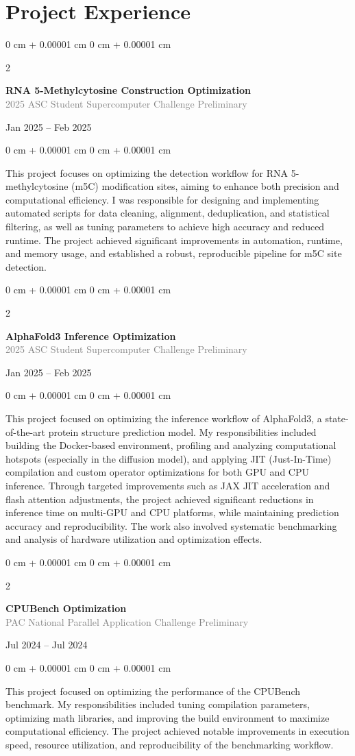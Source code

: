 \documentclass[10pt, letterpaper]{article}
\newcommand{\entryvspace}{\vspace{0.22cm}}
\newenvironment{onecolentry}{
    \begin{adjustwidth}{
        0 cm + 0.00001 cm
    }{
        0 cm + 0.00001 cm
    }
}{
    \end{adjustwidth}
} %
\newenvironment{twocolentry}[2][]{
    \onecolentry
    \def\secondColumn{#2}
    \setcolumnwidth{\fill, 4.5 cm}
    \begin{paracol}{2}
}{
    \switchcolumn \raggedleft \secondColumn
    \end{paracol}
    \endonecolentry
} %
\begin{document}
    \section{Project Experience}
    \begin{twocolentry}{Jan 2025 -- Feb 2025}
        \textbf{RNA 5-Methylcytosine Construction Optimization}\\
        \textcolor{gray}{2025 ASC Student Supercomputer Challenge Preliminary}
    \end{twocolentry}
    \begin{onecolentry}
        This project focuses on optimizing the detection workflow for RNA 5-methylcytosine (m5C) modification sites, aiming to enhance both precision and computational efficiency. I was responsible for designing and implementing automated scripts for data cleaning, alignment, deduplication, and statistical filtering, as well as tuning parameters to achieve high accuracy and reduced runtime. The project achieved significant improvements in automation, runtime, and memory usage, and established a robust, reproducible pipeline for m5C site detection.
    \end{onecolentry}
    \entryvspace
    \begin{twocolentry}{Jan 2025 -- Feb 2025}
        \textbf{AlphaFold3 Inference Optimization}\\
        \textcolor{gray}{2025 ASC Student Supercomputer Challenge Preliminary}
    \end{twocolentry}
    \begin{onecolentry}
        This project focused on optimizing the inference workflow of AlphaFold3, a state-of-the-art protein structure prediction model. My responsibilities included building the Docker-based environment, profiling and analyzing computational hotspots (especially in the diffusion model), and applying JIT (Just-In-Time) compilation and custom operator optimizations for both GPU and CPU inference. Through targeted improvements such as JAX JIT acceleration and flash attention adjustments, the project achieved significant reductions in inference time on multi-GPU and CPU platforms, while maintaining prediction accuracy and reproducibility. The work also involved systematic benchmarking and analysis of hardware utilization and optimization effects.
    \end{onecolentry}
    \entryvspace
    \begin{twocolentry}{Jul 2024 -- Jul 2024}
        \textbf{CPUBench Optimization}\\
        \textcolor{gray}{PAC National Parallel Application Challenge Preliminary}
    \end{twocolentry}
    \begin{onecolentry}
        This project focused on optimizing the performance of the CPUBench benchmark. My responsibilities included tuning compilation parameters, optimizing math libraries, and improving the build environment to maximize computational efficiency. The project achieved notable improvements in execution speed, resource utilization, and reproducibility of the benchmarking workflow.
    \end{onecolentry}
\end{document}
